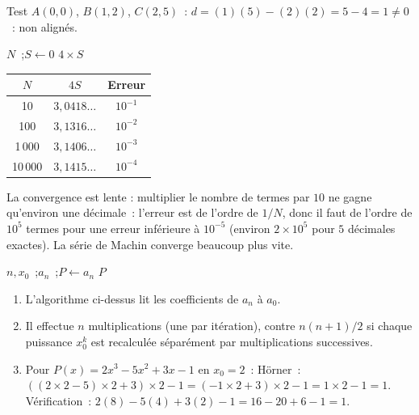 Test $A(0,0)$, $B(1,2)$, $C(2,5)$~:
$d=(1)(5)-(2)(2)=5-4=1\ne0$~: non align\'es.\checkmark


\begin{algorithm}[H]
\caption{$\pi$ par Leibniz}
\Lire $N$~;\quad $S \leftarrow 0$\;
\Afficher $4\times S$\;
\end{algorithm}

\begin{center}
\renewcommand{\arraystretch}{1.2}
\begin{tabular}{ccc}
\toprule
$N$ & $4S$ & Erreur\\
\midrule
10 & $3{,}0418\ldots$ & $10^{-1}$\\
100 & $3{,}1316\ldots$ & $10^{-2}$\\
1\,000 & $3{,}1406\ldots$ & $10^{-3}$\\
10\,000 & $3{,}1415\ldots$ & $10^{-4}$\\
\bottomrule
\end{tabular}
\end{center}

La convergence est lente : multiplier le nombre de termes par $10$ ne gagne
qu'environ une décimale~: l'erreur est de l'ordre de $1/N$, donc il faut de l'ordre de $10^5$ termes pour une erreur inférieure à $10^{-5}$ (environ $2\times10^5$ pour $5$ décimales exactes). La série de Machin converge beaucoup plus vite.


\begin{algorithm}[H]
\caption{Sch\'ema de H\"orner}
\Lire $n, x_0$~;\quad \Lire $a_n$~;\quad $P \leftarrow a_n$\;
\Afficher $P$\;
\end{algorithm}

\begin{enumerate}
  \item L'algorithme ci-dessus lit les coefficients de $a_n$ \`a $a_0$.
  \item Il effectue $n$ multiplications (une par it\'eration), contre
        $n(n+1)/2$ si chaque puissance $x_0^k$ est recalcul\'ee
        s\'epar\'ement par multiplications successives.
  \item Pour $P(x)=2x^3-5x^2+3x-1$ en $x_0=2$~:
        H\"orner~: $((2\times2-5)\times2+3)\times2-1=(-1\times2+3)\times2-1=1\times2-1=1$.
        V\'erification~: $2(8)-5(4)+3(2)-1=16-20+6-1=1$.\checkmark
\end{enumerate}

